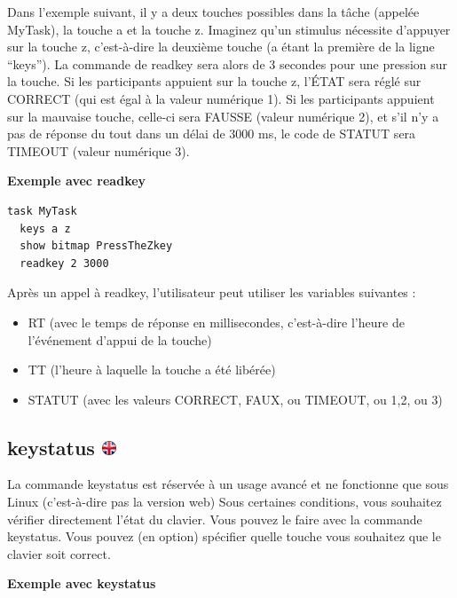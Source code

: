 \documentclass[
]{book}
\providecommand{\tightlist}{%
  \setlength{\itemsep}{0pt}\setlength{\parskip}{0pt}}
\begin{document}
Dans l'exemple suivant, il y a deux touches possibles dans la tâche (appelée MyTask), la touche a et la touche z. Imaginez qu'un stimulus nécessite d'appuyer sur la touche z, c'est-à-dire la deuxième touche (a étant la première de la ligne ``keys''). La commande de readkey sera alors de 3 secondes pour une pression sur la touche. Si les participants appuient sur la touche z, l'ÉTAT sera réglé sur CORRECT (qui est égal à la valeur numérique 1). Si les participants appuient sur la mauvaise touche, celle-ci sera FAUSSE (valeur numérique 2), et s'il n'y a pas de réponse du tout dans un délai de 3000 ms, le code de STATUT sera TIMEOUT (valeur numérique 3).

\textbf{Exemple avec readkey}

\begin{verbatim}
task MyTask
  keys a z
  show bitmap PressTheZkey
  readkey 2 3000
\end{verbatim}

Après un appel à readkey, l'utilisateur peut utiliser les variables suivantes :

\begin{itemize}
\tightlist
\item
  RT (avec le temps de réponse en millisecondes, c'est-à-dire l'heure de l'événement d'appui de la touche)
\item
  TT (l'heure à laquelle la touche a été libérée)
\item
  STATUT (avec les valeurs CORRECT, FAUX, ou TIMEOUT, ou 1,2, ou 3)
\end{itemize}

\hypertarget{keystatus}{%
\subsection[keystatus ]{\texorpdfstring{keystatus \href{https://www.psytoolkit.org/doc3.4.0/syntax.html\#task-keystatus}{\protect\includegraphics{img/ukflag.png}}}{keystatus }}\label{keystatus}}

La commande keystatus est réservée à un usage avancé et ne fonctionne que sous Linux (c'est-à-dire pas la version web)
Sous certaines conditions, vous souhaitez vérifier directement l'état du clavier. Vous pouvez le faire avec la commande keystatus. Vous pouvez (en option) spécifier quelle touche vous souhaitez que le clavier soit correct.

\textbf{Exemple avec keystatus}
\end{document}
